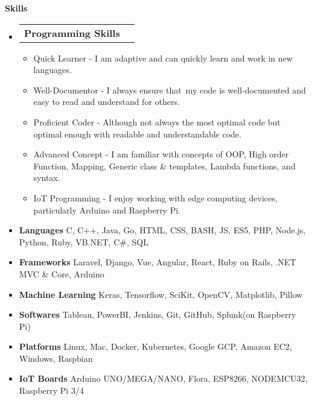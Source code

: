 \documentclass[letterpaper,12pt]{article}[leftmargin=*]
\makeatletter
\def \entryspacing {-0pt}
\renewcommand{\section}[2]{\vspace{5pt}
  \colorbox{secondary}{\color{white}\raggedbottom\normalsize\textbf{{#1}{\hspace{7pt}#2}}}
}
\newcommand{\resumeEntryStart}{\begin{itemize}[leftmargin=2.5mm]}
\newcommand{\resumeEntryEnd}{\end{itemize}\vspace{\entryspacing}}
\newcommand{\resumeItemListStart}{\begin{itemize}[leftmargin=4.5mm]}
\newcommand{\resumeItemListEnd}{\end{itemize}}
\newcommand{\resumeItem}[1]{
  \item\small{
    {#1 \vspace{-2pt}}
  }
}
\newcommand{\resumeEntryTD}[2]{
  \vspace{-1pt}\item[]
    \begin{tabularx}{0.97\textwidth}{X@{\hspace{60pt}}r}
      \textbf{\color{primary}#1} & {\firabook\color{accent}\small#2} \\
    \end{tabularx}\vspace{-6pt}
}
\newcommand{\resumeEntryS}[2]{
  \item[]\small{
    \textbf{\color{primary}#1 }{ #2 \vspace{-6pt}}
  }
}
\makeatother
\begin{document}

\section{\faGears}{Skills}
      \resumeEntryStart
        \resumeEntryTD
          {Programming Skills}{}
        \resumeItemListStart
          \resumeItem {Quick Learner - I am adaptive and can quickly learn and work in new languages.}
          \resumeItem {Well-Documentor - I always ensure that my code is well-documented and easy to read \linebreak and understand for others.}
          \resumeItem {Proficient Coder - Although not always the most optimal code but optimal enough with \linebreak readable and understandable code.}
          \resumeItem {Advanced Concept - I am familiar with concepts of OOP, High order Function, Mapping,\linebreak
           Generic class \& templates, Lambda functions, and syntax.}
          \resumeItem {IoT Programming - I enjoy working with edge computing devices, particularly Arduino \linebreak and Raspberry Pi.}
          \resumeItemListEnd
        \resumeEntryS{Languages} { C, C++, Java, Go, HTML, CSS, BASH, JS, ES5, PHP, Node.js, Python, Ruby, VB.NET, C\#, SQL}
        \resumeEntryS{Frameworks} {Laravel, Django, Vue, Angular, React, Ruby on Rails, .NET MVC \& Core, Arduino}
        \resumeEntryS{Machine Learning} {Keras, Tensorflow, SciKit, OpenCV, Matplotlib, Pillow}
        \resumeEntryS{Softwares} {Tableau, PowerBI, Jenkins, Git, GitHub, Splunk(on Raspberry Pi)}
        \resumeEntryS{Platforms} {Linux, Mac, Docker, Kubernetes, Google GCP, Amazon EC2, Windows, Raspbian}
        \resumeEntryS{IoT Boards} {Arduino UNO/MEGA/NANO, Flora, ESP8266, NODEMCU32, Raspberry Pi 3/4}
      
      \begin{flushright}
      \end{flushright}
  \resumeEntryEnd    
  
\end{document}
